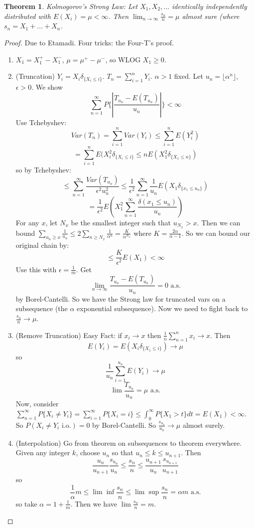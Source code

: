 \documentclass[12pt]{article}
\newtheorem{theorem}{Theorem}
\begin{document}
\begin{theorem}
Kolmogorov's Strong Law: Let $X_1, X_2, ...$ identically independently distributed with $E(X_i) = \mu < \infty$.  Then $\lim_{n \to \infty} \frac{s_n}{n} = \mu$ almost sure (where $s_n = X_1 + ... + X_n$.
\end{theorem}
\begin{proof}
Due to Etamadi.  Four tricks: the Four-T's proof.

\begin{enumerate}
\item $X_1 = X_1^+ - X_1^-$, $\mu = \mu^+ - \mu^-$, so WLOG $X_1 \ge 0$.

\item (Truncation) $Y_i = X_i \delta_{ \{ X_i \le i \} }$.  $T_n = \sum_{i=1}^n Y_i$.  $\alpha > 1$ fixed.  Let $u_n = \lfloor \alpha^n \rfloor$, $\epsilon > 0$.  We show
$$\sum_{n=1}^\infty P \{ |\frac{T_{u_n} - E(T_{u_n})}{u_n}| \} < \infty$$
Use Tchebyshev:
$$Var(T_n) = \sum_{i=1}^n Var(Y_i) \le \sum_{i=1}^n E(Y_i^2)$$
$$ = \sum_{i=1}^n E(X_i^2 \delta_{\{ X_i \le i \}} \le n E(X_1^2 \delta_{\{X_1 \le n\}})$$
so by Tchebyshev:
$$\le \sum_{n=1}^\infty \frac{Var(T_{u_n})}{\epsilon^2 u_n^2} \le \frac{1}{\epsilon^2} \sum_{n=1}^\infty \frac{1}{u_n} E(X_1 \delta_{\{ x_1 \le u_n \}})$$
$$= \frac{1}{\epsilon^2} E(X_1^2 \sum_{n=1}^\infty \frac{ \delta(x_1 \le u_n) }{u_n} ) $$
For any $x$, let $N_x$ be the smallest integer such that $u_{N_x} > x$.  Then we can bound $\sum_{u_n \ge x} \frac{1}{u_n} \le 2 \sum_{n \ge N_x} \frac{1}{\alpha^n} = \frac{K}{\alpha^{N_x}}$ where $K = \frac{2 \alpha}{\alpha - 1}$.
So we can bound our original chain by:
$$\le \frac{K}{\epsilon^2} E(X_1) < \infty$$
Use this with $\epsilon = \frac{1}{m}$.  Get 
$$\lim_{n \to \infty} \frac{T_{u_n} - E(T_{u_n}) }{ u_n} = 0 \textrm{ a.s.}$$
by Borel-Cantelli.  So we have the Strong law for truncated vars on a subsequence (the $\alpha$ exponential subsequence).  Now we need to fight back to $\frac{s_n}{n} \to \mu$.

\item (Remove Truncation) Easy Fact: if $x_i \to x$ then $\frac{1}{n} \sum_{n=1}^n x_i \to x$.  Then
$$E(Y_i) = E(X_i \delta_{\{X_1 \le i\}}) \rightarrow \mu$$
so
$$\frac{1}{u_n} \sum_{i=1}^{u_n} E(Y_i) \rightarrow \mu$$
$$\lim \frac{T_{u_n}}{u_n} = \mu \textrm{ a.s.}$$
Now, consider $\sum_{n=1}^\infty P \{X_i \neq Y_i \} = \sum_{i=1}^\infty P \{ X_i = i \} \le \int_0^\infty P \{X_1 > t \} dt = E(X_1) < \infty$.  So $P(X_i \neq Y_i \textrm{ i.o.}) = 0$ by Borel-Cantelli.  So $\frac{s_{u_n}}{u_n} \to \mu$ almost surely.

\item (Interpolation) Go from theorem on subsequences to theorem everywhere.  Given any integer $k$, choose $u_n$ so that $u_n \le k \le u_{n+1}$.  Then
$$\frac{u_n}{u_{n+1}} \frac{s_{u_n}}{u_n} \le \frac{s_n}{n} \le \frac{u_{n+1}}{u_n} \frac{s_{u_{n+1}}}{u_{n+1}}$$
so
$$\frac{1}{\alpha} m \le \lim \inf \frac{s_n}{n} \le \lim \sup \frac{s_n}{n} = \alpha m \textrm{ a.s.}$$
so take $\alpha = 1 + \frac{1}{m}$.  Then we have $\lim \frac{s_n}{n} = m$.

\end{enumerate}
\end{proof}
\end{document}
